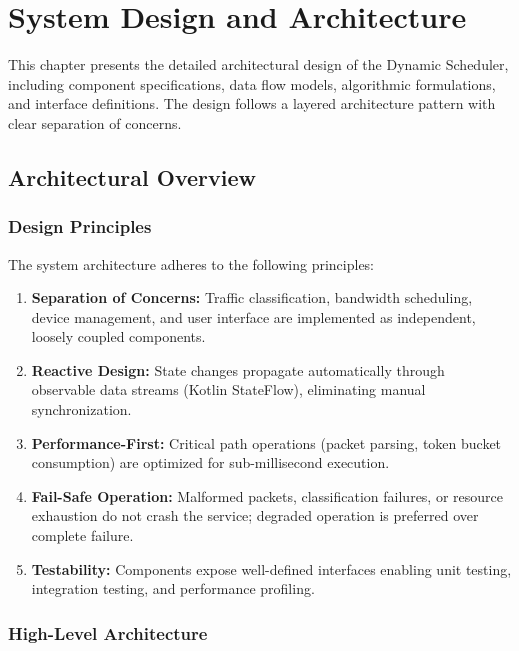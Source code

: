\chapter{System Design and Architecture}
\label{ch:system-design}

This chapter presents the detailed architectural design of the Dynamic \qos Scheduler, including component specifications, data flow models, algorithmic formulations, and interface definitions. The design follows a layered architecture pattern with clear separation of concerns.

\section{Architectural Overview}
\label{sec:arch-overview}

\subsection{Design Principles}

The system architecture adheres to the following principles:

\begin{enumerate}[leftmargin=*]
    \item \textbf{Separation of Concerns:} Traffic classification, bandwidth scheduling, device management, and user interface are implemented as independent, loosely coupled components.
    
    \item \textbf{Reactive Design:} State changes propagate automatically through observable data streams (Kotlin StateFlow), eliminating manual synchronization.
    
    \item \textbf{Performance-First:} Critical path operations (packet parsing, token bucket consumption) are optimized for sub-millisecond execution.
    
    \item \textbf{Fail-Safe Operation:} Malformed packets, classification failures, or resource exhaustion do not crash the service; degraded operation is preferred over complete failure.
    
    \item \textbf{Testability:} Components expose well-defined interfaces enabling unit testing, integration testing, and performance profiling.
\end{enumerate}

\subsection{High-Level Architecture}

